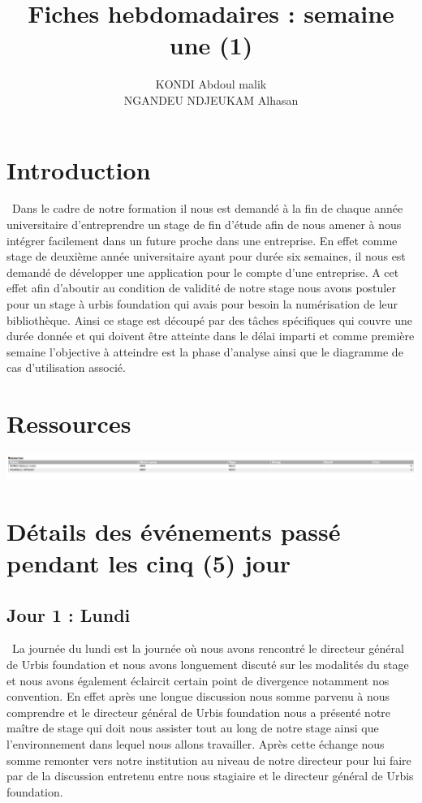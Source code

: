 \documentclass[12pt,a4paper]{article}
\author{KONDI Abdoul malik \\ NGANDEU NDJEUKAM Alhasan}
\title{Fiches hebdomadaires : semaine une (1)}
\begin{document}
\maketitle
\tableofcontents
\newpage

\section{Introduction}
\ Dans le cadre de notre formation il nous est demandé à la fin de chaque année universitaire d’entreprendre un stage de fin d’étude afin de nous amener à nous intégrer facilement dans un future proche dans une entreprise. En effet comme stage de deuxième année universitaire ayant pour durée six semaines, il nous est demandé de développer une application pour le compte d’une entreprise. A cet effet afin d’aboutir au condition de validité de notre stage nous avons postuler pour un stage à urbis foundation qui avais pour besoin la numérisation de leur bibliothèque. Ainsi ce stage est découpé par des tâches spécifiques qui couvre une durée donnée et qui doivent être atteinte dans le délai imparti et comme première semaine l’objective à atteindre est la phase d’analyse ainsi que le diagramme de cas d’utilisation associé.
\section{Ressources}
\includegraphics[scale=0.25]{images/resources.png}
\section{Détails des événements passé pendant les cinq (5) jour}
\subsection{Jour 1 : Lundi}
\ La journée du lundi est la journée où nous avons rencontré le directeur général de Urbis foundation et nous avons longuement discuté sur les modalités du stage et nous avons également éclaircit certain point de divergence notamment nos convention. En effet après une longue discussion nous somme parvenu à nous comprendre et le directeur général de Urbis foundation nous a présenté notre maître de stage qui doit nous assister tout au long de notre stage ainsi que l’environnement dans lequel nous allons travailler. Après cette échange nous somme remonter vers notre institution au niveau de notre directeur pour lui faire par de la discussion entretenu entre nous stagiaire et le directeur général de Urbis foundation. 
\newpage
\end{document}
